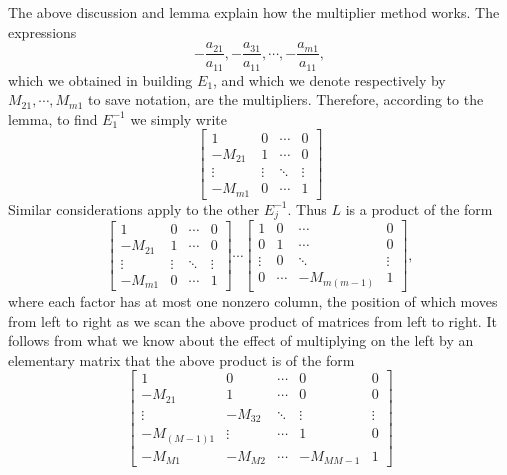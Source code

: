 \documentclass{ximera}
\begin{document}
The above discussion and lemma explain how the multiplier
method works. The expressions
\begin{equation*}
-\frac{a_{21}}{a_{11}},-\frac{a_{31}}{a_{11}},\cdots, -\frac{a_{m1}}{a_{11}},
\end{equation*}
which we obtained in building $E_{1}$, and which we denote respectively by $M_{21},\cdots ,M_{m1}$ to save notation, are the multipliers.
 Therefore, according to the lemma, to find $E_{1}^{-1}$ we simply write
\begin{equation*}
\begin{bmatrix}
1 & 0 & \cdots & 0 \\
-M_{21} & 1 & \cdots & 0 \\
\vdots & \vdots & \ddots & \vdots \\
-M_{m1} & 0 & \cdots & 1
\end{bmatrix}
\end{equation*}
Similar considerations apply to the other $E_{j}^{-1}.$ Thus $L$ is a
product of the form
\begin{equation*}
\begin{bmatrix}
1 & 0 & \cdots & 0 \\
-M_{21} & 1 & \cdots & 0 \\
\vdots & \vdots & \ddots & \vdots \\
-M_{m1} & 0 & \cdots & 1
\end{bmatrix}
\cdots 
\begin{bmatrix}
1 & 0 & \cdots & 0 \\
0 & 1 & \cdots & 0 \\
\vdots & 0 & \ddots & \vdots \\
0 & \cdots & -M_{m(m-1)} & 1
\end{bmatrix}, 
\end{equation*}
where each factor has at most one nonzero column, the position of which moves from left to right as we scan the above product of matrices from left to right. It follows from what we know  about the effect of multiplying on the left by an elementary matrix that the above product is of the form
\begin{equation*}
\begin{bmatrix}
1 & 0 & \cdots & 0 & 0 \\
-M_{21} & 1 & \cdots & 0 & 0 \\
\vdots & -M_{32} & \ddots & \vdots & \vdots \\
-M_{(M-1)1} & \vdots & \cdots & 1 & 0 \\
-M_{M1} & -M_{M2} & \cdots & -M_{MM-1} & 1
\end{bmatrix}
\end{equation*}
\end{document}
